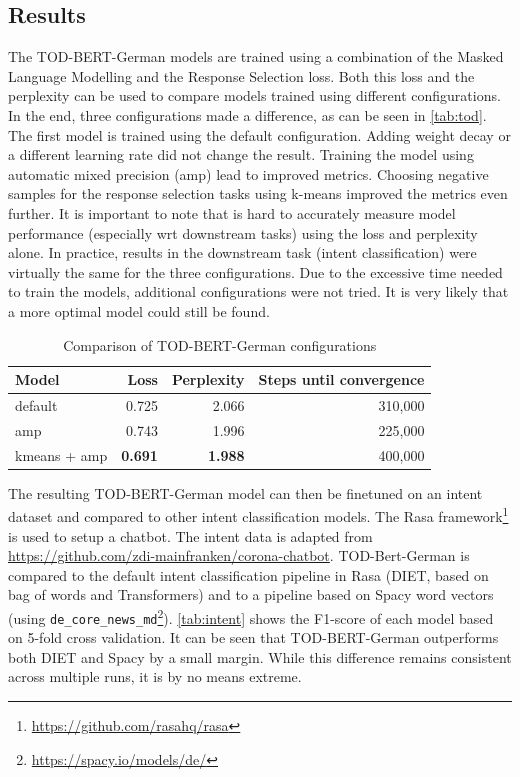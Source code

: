 \documentclass{article}
\begin{document}
\subsection{Results}
The TOD-BERT-German models are trained using a combination of the Masked Language Modelling and the Response Selection loss. Both this loss and the perplexity can be used to compare models trained using different configurations. In the end, three configurations made a difference, as can be seen in \autoref{tab:tod}. The first model is trained using the default configuration. Adding weight decay or a different learning rate did not change the result. Training the model using automatic mixed precision (amp) lead to improved metrics. Choosing negative samples for the response selection tasks using k-means improved the metrics even further. It is important to note that is hard to accurately measure model performance (especially wrt downstream tasks) using the loss and perplexity alone. In practice, results in the downstream task (intent classification) were virtually the same for the three configurations. Due to the excessive time needed to train the models, additional configurations were not tried. It is very likely that a more optimal model could still be found.

\begin{table}
	\begin{tabular}{l r r r}
	Model & Loss & Perplexity & Steps until convergence \\
	\hline
	default & 0.725 & 2.066 & 310,000 \\
	amp & 0.743 & 1.996 & 225,000 \\
	kmeans + amp & \textbf{0.691} & \textbf{1.988} & 400,000 \\
	\end{tabular}
\caption{Comparison of TOD-BERT-German configurations}
\label{tab:tod}
\end{table}

The resulting TOD-BERT-German model can then be finetuned on an intent dataset and compared to other intent classification models. The Rasa framework\footnote{\url{https://github.com/rasahq/rasa}} is used to setup a chatbot. The intent data is adapted from \url{https://github.com/zdi-mainfranken/corona-chatbot}. TOD-Bert-German is compared to the default intent classification pipeline in Rasa (DIET, based on bag of words and Transformers) and to a pipeline based on Spacy word vectors (using \texttt{de\_core\_news\_md}\footnote{\url{https://spacy.io/models/de/}}). \autoref{tab:intent} shows the F1-score of each model based on 5-fold cross validation. It can be seen that TOD-BERT-German outperforms both DIET and Spacy by a small margin. While this difference remains consistent across multiple runs, it is by no means extreme.
\end{document}
